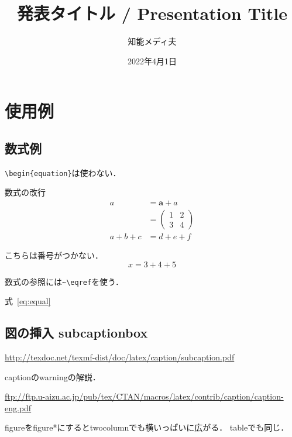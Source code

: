 \documentclass[a4paper,10pt]{ltjsarticle}
\date{2022年4月1日}
\author{知能メディ夫}
\title{発表タイトル / Presentation Title}
\begin{document}
    \maketitle
    

    \section{使用例}
    \subsection{数式例}
    \verb|\begin{equation}|は使わない．

    数式の改行
    \begin{align}
        a &= \bm{a} + a \nonumber \\
        &=
        \begin{pmatrix}
            1 & 2\\
            3 & 4
        \end{pmatrix}
        \label{eq:equal}
        \\
        a + b + c &= d + e + f
    \end{align}

    こちらは番号がつかない．
    \[
    x=3+4+5
    \]

    数式の参照には\verb|~\eqref|を使う．
    
    式~\eqref{eq:equal}


    \subsection{図の挿入 subcaptionbox}

    \url{http://texdoc.net/texmf-dist/doc/latex/caption/subcaption.pdf}

    captionのwarningの解説．

    \url{ftp://ftp.u-aizu.ac.jp/pub/tex/CTAN/macros/latex/contrib/caption/caption-eng.pdf}

    figureをfigure*にするとtwocolumnでも横いっぱいに広がる．
    tableでも同じ．
\end{document}
